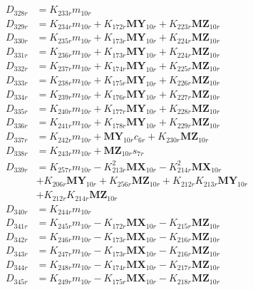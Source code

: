\begin{align}
 \nonumber \\ 
D_{328r} &= K_{233r}m_{10r} \nonumber \\
D_{329r} &= K_{234r}m_{10r} + K_{172r}\mathbf{MY}_{10r} + K_{223r}\mathbf{MZ}_{10r} \nonumber \\
D_{330r} &= K_{235r}m_{10r} + K_{173r}\mathbf{MY}_{10r} + K_{224r}\mathbf{MZ}_{10r} \nonumber \\
D_{331r} &= K_{236r}m_{10r} + K_{173r}\mathbf{MY}_{10r} + K_{224r}\mathbf{MZ}_{10r} \nonumber \\
D_{332r} &= K_{237r}m_{10r} + K_{174r}\mathbf{MY}_{10r} + K_{225r}\mathbf{MZ}_{10r} \nonumber \\
D_{333r} &= K_{238r}m_{10r} + K_{175r}\mathbf{MY}_{10r} + K_{226r}\mathbf{MZ}_{10r} \nonumber \\
D_{334r} &= K_{239r}m_{10r} + K_{176r}\mathbf{MY}_{10r} + K_{227r}\mathbf{MZ}_{10r} \nonumber \\
D_{335r} &= K_{240r}m_{10r} + K_{177r}\mathbf{MY}_{10r} + K_{228r}\mathbf{MZ}_{10r} \nonumber \\
D_{336r} &= K_{241r}m_{10r} + K_{178r}\mathbf{MY}_{10r} + K_{229r}\mathbf{MZ}_{10r} \nonumber \\
D_{337r} &= K_{242r}m_{10r} + \mathbf{MY}_{10r}c_{6r} + K_{230r}\mathbf{MZ}_{10r} \nonumber \\
D_{338r} &= K_{243r}m_{10r} + \mathbf{MZ}_{10r}s_{7r} \nonumber \\
D_{339r} &= K_{257r}m_{10r} - K_{213r}^2\mathbf{MX}_{10r} - K_{214r}^2\mathbf{MX}_{10r}  \nonumber \\
&+ K_{206r}\mathbf{MY}_{10r} + K_{256r}\mathbf{MZ}_{10r} + K_{212r}K_{213r}\mathbf{MY}_{10r}  \nonumber \\
&+ K_{212r}K_{214r}\mathbf{MZ}_{10r} \nonumber \\
D_{340r} &= K_{244r}m_{10r} \nonumber \\
D_{341r} &= K_{245r}m_{10r} - K_{172r}\mathbf{MX}_{10r} - K_{215r}\mathbf{MZ}_{10r} \nonumber \\
D_{342r} &= K_{246r}m_{10r} - K_{173r}\mathbf{MX}_{10r} - K_{216r}\mathbf{MZ}_{10r} \nonumber \\
D_{343r} &= K_{247r}m_{10r} - K_{173r}\mathbf{MX}_{10r} - K_{216r}\mathbf{MZ}_{10r} \nonumber \\
D_{344r} &= K_{248r}m_{10r} - K_{174r}\mathbf{MX}_{10r} - K_{217r}\mathbf{MZ}_{10r} \nonumber \\
D_{345r} &= K_{249r}m_{10r} - K_{175r}\mathbf{MX}_{10r} - K_{218r}\mathbf{MZ}_{10r} \nonumber \\

\end{align}

